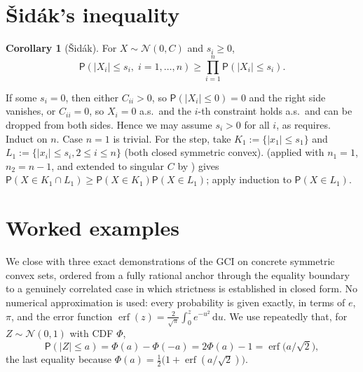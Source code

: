 \documentclass[12pt,a4paper]{article}
\makeatletter
\theoremstyle{definition}
\newtheorem{corollary}[theorem]{Corollary}
\renewenvironment{proof}[1][\proofname]{\par
  \pushQED{\qed}%
  \normalfont \topsep6\p@\@plus6\p@\relax
  \trivlist
  \item[\hskip\labelsep\bfseries #1\@addpunct{.}]\ignorespaces
}{%
  \popQED\endtrivlist\@endpefalse
}
\newcommand{\PP}{\mathsf{P}}
\newcommand{\dd}{\mathrm{d}}
\newcommand{\caln}{\mathcal{N}}
\newcommand{\erf}{\operatorname{erf}}
\makeatother
\begin{document}
\section{\v{S}id\'ak's inequality}\label{sec:corollaries}

\begin{corollary}[\v{S}id\'ak]\label{cor:sidak}
  For $X\sim\caln(0,C)$ and $s_i\geqslant 0$,
  \[
    \PP(|X_i|\leqslant s_i,\;i=1,\ldots,n)
    \geqslant\prod_{i=1}^n\PP(|X_i|\leqslant s_i).
  \]
\end{corollary}

\begin{proof}
  If some $s_i=0$, then either $C_{ii}>0$, so $\PP(|X_i|\leqslant 0)=0$
  and the right side vanishes, or $C_{ii}=0$, so $X_i=0$ a.s.\ and the
  $i$-th constraint holds a.s.\ and can be dropped from both sides.  Hence
  we may assume $s_i>0$ for all $i$, as  requires.
  Induct on $n$.  Case $n=1$ is trivial.  For the step, take
  $K_1:=\{|x_1|\leqslant s_1\}$ and
  $L_1:=\{|x_i|\leqslant s_i,2\leqslant i\leqslant n\}$ (both closed symmetric
  convex).   (applied with $n_1=1$, $n_2=n-1$, and
  extended to singular $C$ by ) gives
  $\PP(X\in K_1\cap L_1)\geqslant\PP(X\in K_1)\PP(X\in L_1)$;
  apply induction to $\PP(X\in L_1)$.
\end{proof}


\section{Worked examples}\label{sec:examples}

We close with three exact demonstrations of the GCI on concrete
symmetric convex sets, ordered from a fully rational anchor through the
equality boundary to a genuinely correlated case in which strictness is
established in closed form.  No numerical approximation is used: every
probability is given exactly, in terms of $e$, $\pi$, and the error
function $\erf(z)=\tfrac{2}{\sqrt\pi}\int_0^z e^{-u^2}\,\dd u$.  We use
repeatedly that, for $Z\sim\caln(0,1)$ with CDF $\Phi$,
\begin{equation}\label{eq:ex-erf}
  \PP(|Z|\leqslant a)=\Phi(a)-\Phi(-a)=2\Phi(a)-1=\erf\!\bigl(a/\sqrt2\bigr),
\end{equation}
the last equality because $\Phi(a)=\tfrac12\bigl(1+\erf(a/\sqrt2)\bigr)$.
\end{document}
